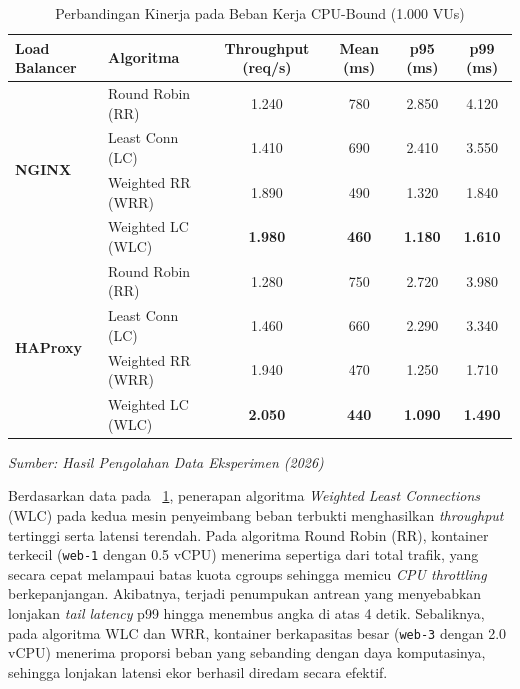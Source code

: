 \begin{table}[htbp]
    \centering
    \singlespacing
    \small
    \caption{Perbandingan Kinerja pada Beban Kerja CPU-Bound (1.000 VUs)}
    \label{tab:hasil_cpubound}
    \begin{tabular}{l l c c c c}
        \toprule
        \textbf{Load Balancer} & \textbf{Algoritma} & \textbf{Throughput (req/s)} & \textbf{Mean (ms)} & \textbf{p95 (ms)} & \textbf{p99 (ms)} \\
        \midrule
        \multirow{4}{*}{\textbf{NGINX}} 
        & Round Robin (RR)       & 1.240 & 780  & 2.850 & 4.120 \\
        & Least Conn (LC)        & 1.410 & 690  & 2.410 & 3.550 \\
        & Weighted RR (WRR)      & 1.890 & 490  & 1.320 & 1.840 \\
        & Weighted LC (WLC)     & \textbf{1.980} & \textbf{460}  & \textbf{1.180} & \textbf{1.610} \\
        \midrule
        \multirow{4}{*}{\textbf{HAProxy}} 
        & Round Robin (RR)       & 1.280 & 750  & 2.720 & 3.980 \\
        & Least Conn (LC)        & 1.460 & 660  & 2.290 & 3.340 \\
        & Weighted RR (WRR)      & 1.940 & 470  & 1.250 & 1.710 \\
        & Weighted LC (WLC)     & \textbf{2.050} & \textbf{440}  & \textbf{1.090} & \textbf{1.490} \\
        \bottomrule
    \end{tabular}
    \vspace{4pt}
    \raggedright \footnotesize \textit{Sumber: Hasil Pengolahan Data Eksperimen (2026)}
\end{table}

Berdasarkan data pada \tablename\ \ref{tab:hasil_cpubound}, penerapan algoritma \textit{Weighted Least Connections} (WLC) pada kedua mesin penyeimbang beban terbukti menghasilkan \textit{throughput} tertinggi serta latensi terendah. Pada algoritma Round Robin (RR), kontainer terkecil (\texttt{web-1} dengan 0.5 vCPU) menerima sepertiga dari total trafik, yang secara cepat melampaui batas kuota cgroups sehingga memicu \textit{CPU throttling} berkepanjangan. Akibatnya, terjadi penumpukan antrean yang menyebabkan lonjakan \textit{tail latency} p99 hingga menembus angka di atas 4 detik. Sebaliknya, pada algoritma WLC dan WRR, kontainer berkapasitas besar (\texttt{web-3} dengan 2.0 vCPU) menerima proporsi beban yang sebanding dengan daya komputasinya, sehingga lonjakan latensi ekor berhasil diredam secara efektif.

